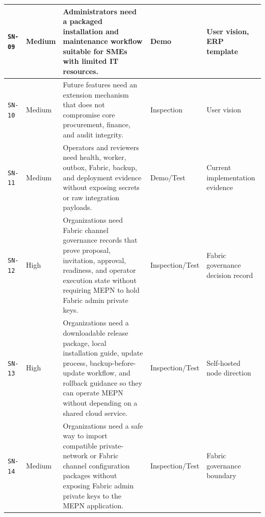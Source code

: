 \documentclass[11pt,a4paper]{article}
\begin{document}
\begin{footnotesize}
\begin{longtable}{@{}p{}p{}p{}p{}p{}@{}}
\texttt{SN-09} & Medium & Administrators need a packaged installation and maintenance workflow suitable for SMEs with limited IT resources. & Demo & User vision, ERP template \\ \hline
\texttt{SN-10} & Medium & Future features need an extension mechanism that does not compromise core procurement, finance, and audit integrity. & Inspection & User vision \\ \hline
\texttt{SN-11} & Medium & Operators and reviewers need health, worker, outbox, Fabric, backup, and deployment evidence without exposing secrets or raw integration payloads. & Demo/Test & Current implementation evidence \\ \hline
\texttt{SN-12} & High & Organizations need Fabric channel governance records that prove proposal, invitation, approval, readiness, and operator execution state without requiring MEPN to hold Fabric admin private keys. & Inspection/Test & Fabric governance decision record \\ \hline
\texttt{SN-13} & High & Organizations need a downloadable release package, local installation guide, update process, backup-before-update workflow, and rollback guidance so they can operate MEPN without depending on a shared cloud service. & Inspection/Test & Self-hosted node direction \\ \hline
\texttt{SN-14} & Medium & Organizations need a safe way to import compatible private-network or Fabric channel configuration packages without exposing Fabric admin private keys to the MEPN application. & Inspection/Test & Fabric governance boundary \\ \hline
\end{longtable}
\end{footnotesize}
\end{document}
